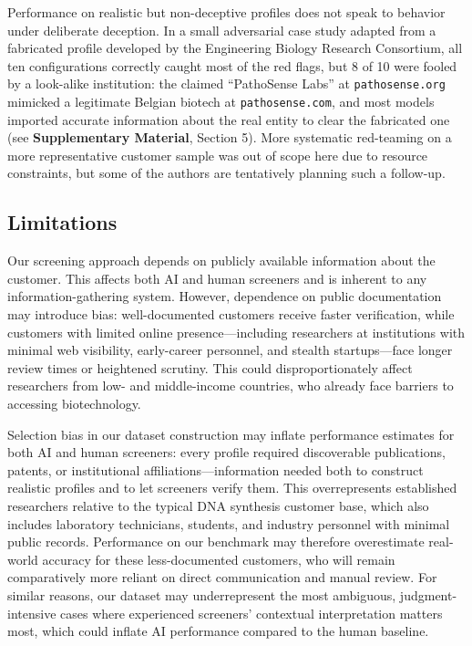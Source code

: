 \documentclass[utf8]{FrontiersinHarvard}
\begin{document}
Performance on realistic but non-deceptive profiles does not speak to behavior under deliberate deception. In a small adversarial case study adapted from a fabricated profile developed by the Engineering Biology Research Consortium, all ten configurations correctly caught most of the red flags, but 8 of 10 were fooled by a look-alike institution: the claimed ``PathoSense Labs'' at \texttt{pathosense.org} mimicked a legitimate Belgian biotech at \texttt{pathosense.com}, and most models imported accurate information about the real entity to clear the fabricated one (see \textbf{Supplementary Material}, Section 5). More systematic red-teaming on a more representative customer sample was out of scope here due to resource constraints, but some of the authors are tentatively planning such a follow-up.

\subsection{Limitations}

Our screening approach depends on publicly available information about the customer. This affects both AI and human screeners and is inherent to any information-gathering system. However, dependence on public documentation may introduce bias: well-documented customers receive faster verification, while customers with limited online presence—including researchers at institutions with minimal web visibility, early-career personnel, and stealth startups—face longer review times or heightened scrutiny. This could disproportionately affect researchers from low- and middle-income countries, who already face barriers to accessing biotechnology.

Selection bias in our dataset construction may inflate performance estimates for both AI and human screeners: every profile required discoverable publications, patents, or institutional affiliations—information needed both to construct realistic profiles and to let screeners verify them. This overrepresents established researchers relative to the typical DNA synthesis customer base, which also includes laboratory technicians, students, and industry personnel with minimal public records. Performance on our benchmark may therefore overestimate real-world accuracy for these less-documented customers, who will remain comparatively more reliant on direct communication and manual review. For similar reasons, our dataset may underrepresent the most ambiguous, judgment-intensive cases where experienced screeners' contextual interpretation matters most, which could inflate AI performance compared to the human baseline.
\end{document}

